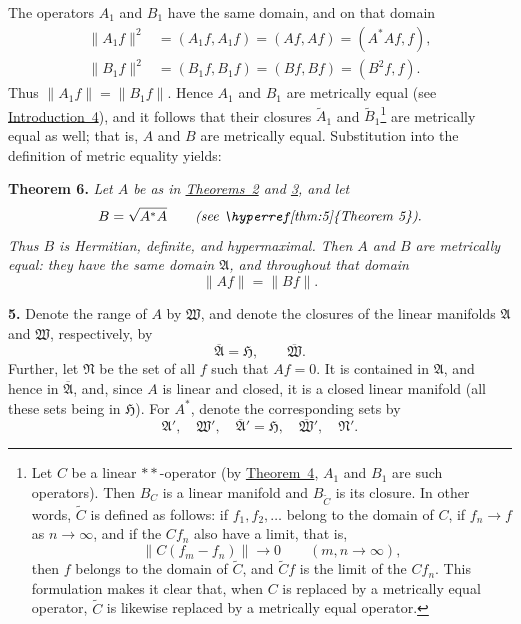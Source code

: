 \documentclass[fontsize=13pt,paper=b5,leqno,bookmarkpackage=false]{scrartcl}
\begin{document}
The operators \(A_1\) and \(B_1\) have the same domain, and on that domain
\[
\begin{aligned}
  \lVert A_1f\rVert^2
    &=(A_1f,A_1f)=(Af,Af)=(A^*Af,f),\\
  \lVert B_1f\rVert^2
    &=(B_1f,B_1f)=(Bf,Bf)=(B^2f,f).
\end{aligned}
\]
Thus \(\lVert A_1f\rVert=\lVert B_1f\rVert\).  Hence \(A_1\) and \(B_1\)
are metrically equal (see \hyperref[intro:4]{Introduction~4}), and it
follows that their closures \(\widetilde A_1\) and
\(\widetilde B_1\)\footnote{\label{fn:18}Let \(C\) be a linear
\(**\)-operator (by \hyperref[thm:4]{Theorem~4}, \(A_1\) and \(B_1\) are
such operators).  Then \(B_C\) is a linear manifold and
\(B_{\widetilde C}\) is its closure.  In other words, \(\widetilde C\) is
defined as follows: if \(f_1,f_2,\ldots\) belong to the domain of \(C\),
if \(f_n\to f\) as \(n\to\infty\), and if the \(Cf_n\) also have a limit,
that is,
\[
  \lVert C(f_m-f_n)\rVert\longrightarrow0
  \qquad(m,n\to\infty),
\]
then \(f\) belongs to the domain of \(\widetilde C\), and
\(\widetilde Cf\) is the limit of the \(Cf_n\).  This formulation makes
it clear that, when \(C\) is replaced by a metrically equal operator,
\(\widetilde C\) is likewise replaced by a metrically equal operator.}
are metrically equal as well; that is, \(A\) and \(B\) are metrically
equal.  Substitution into the definition of metric equality yields:

\par\smallskip
{}
\label{thm:6}
\noindent\textbf{Theorem 6.}
\textit{Let \(A\) be as in \hyperref[thm:2]{Theorems~2} and
\hyperref[thm:3]{3}, and let}
\[
  B=\sqrt{A^*A}
  \qquad\textit{(see \hyperref[thm:5]{Theorem~5})}.
\]
\textit{Thus \(B\) is Hermitian, definite, and hypermaximal.  Then \(A\)
and \(B\) are metrically equal: they have the same domain
\(\mathfrak A\), and throughout that domain}
\[
  \lVert Af\rVert=\lVert Bf\rVert.
\]

\par\smallskip
{}
\label{subsec:I.5}
\noindent\textbf{5.}
Denote the range of \(A\) by \(\mathfrak W\), and denote the closures of
the linear manifolds \(\mathfrak A\) and \(\mathfrak W\), respectively,
by
\[
  \overline{\mathfrak A}=\mathfrak H,
  \qquad
  \overline{\mathfrak W}.
\]
Further, let \(\mathfrak N\) be the set of all \(f\) such that \(Af=0\).
It is contained in \(\mathfrak A\), and hence in
\(\overline{\mathfrak A}\), and, since \(A\) is linear and closed, it is
a closed linear manifold (all these sets being in \(\mathfrak H\)).
For \(A^*\), denote the corresponding sets by
\[
  \mathfrak A',\quad
  \mathfrak W',\quad
  \overline{\mathfrak A}'=\mathfrak H,\quad
  \overline{\mathfrak W}',\quad
  \mathfrak N'.
\]
\end{document}
